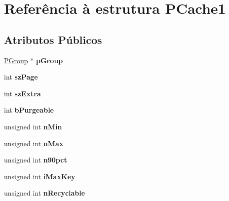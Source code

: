 \hypertarget{struct_p_cache1}{\section{Referência à estrutura P\-Cache1}
\label{struct_p_cache1}
}
\subsection*{Atributos Públicos}
\begin{DoxyCompactItemize}
\item 
\hypertarget{struct_p_cache1_ae3389f0c68d6946a1eebeeee835ece69}{\hyperlink{struct_p_group}{P\-Group} $\ast$ {\bfseries p\-Group}}\label{struct_p_cache1_ae3389f0c68d6946a1eebeeee835ece69}

\item 
\hypertarget{struct_p_cache1_a1425039a858b7518c097d8ae92597de0}{int {\bfseries sz\-Page}}\label{struct_p_cache1_a1425039a858b7518c097d8ae92597de0}

\item 
\hypertarget{struct_p_cache1_a1e96e6671732e0af641732991b681ede}{int {\bfseries sz\-Extra}}\label{struct_p_cache1_a1e96e6671732e0af641732991b681ede}

\item 
\hypertarget{struct_p_cache1_a2af7d24e27369252addec9bef45afcfc}{int {\bfseries b\-Purgeable}}\label{struct_p_cache1_a2af7d24e27369252addec9bef45afcfc}

\item 
\hypertarget{struct_p_cache1_a9e96c79ec60c2e368f92a2ba52d01c44}{unsigned int {\bfseries n\-Min}}\label{struct_p_cache1_a9e96c79ec60c2e368f92a2ba52d01c44}

\item 
\hypertarget{struct_p_cache1_aef08139a0b86b0c0a7ee2bec0bab2405}{unsigned int {\bfseries n\-Max}}\label{struct_p_cache1_aef08139a0b86b0c0a7ee2bec0bab2405}

\item 
\hypertarget{struct_p_cache1_a8a5c5ab7d71e66c2a4df3f22513888f0}{unsigned int {\bfseries n90pct}}\label{struct_p_cache1_a8a5c5ab7d71e66c2a4df3f22513888f0}

\item 
\hypertarget{struct_p_cache1_a2dff616ad2d1873ad3a8d20d53bcb4d0}{unsigned int {\bfseries i\-Max\-Key}}\label{struct_p_cache1_a2dff616ad2d1873ad3a8d20d53bcb4d0}

\item 
\hypertarget{struct_p_cache1_a3501394bd251f08d1f9d26d3b2d4c67c}{unsigned int {\bfseries n\-Recyclable}}\label{struct_p_cache1_a3501394bd251f08d1f9d26d3b2d4c67c}


\end{DoxyCompactItemize}
